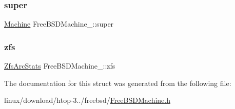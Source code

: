 \subsubsection{\texorpdfstring{super}{super}}
{\footnotesize\ttfamily \hyperlink{Machine_8h_aa3706f95e4706b9d02979efcabb1341d}{Machine} Free\+B\+S\+D\+Machine\+\_\+\+::super}

\mbox{\label{structFreeBSDMachine___a32efe234d03f0515e1a5bd9b72a93c28}} 
\subsubsection{\texorpdfstring{zfs}{zfs}}
{\footnotesize\ttfamily \hyperlink{ZfsArcStats_8h_a2adeccbbba50329f61d34f355e5faddc}{Zfs\+Arc\+Stats} Free\+B\+S\+D\+Machine\+\_\+\+::zfs}



The documentation for this struct was generated from the following file\+:\begin{DoxyCompactItemize}
\item 
linux/download/htop-\/3../freebsd/\hyperlink{FreeBSDMachine_8h}{Free\+B\+S\+D\+Machine.\+h}\end{DoxyCompactItemize}
